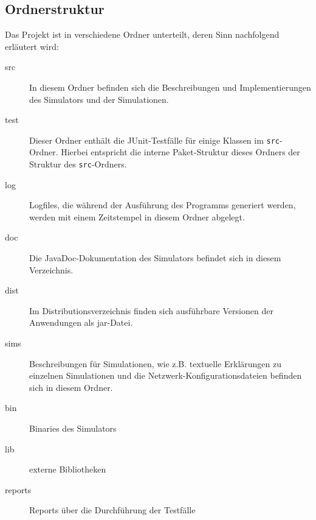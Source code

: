 \subsection{Ordnerstruktur}
Das Projekt ist in verschiedene Ordner unterteilt, deren Sinn nachfolgend erläutert wird:
\begin{description}
	\item[src] In diesem Ordner befinden sich die Beschreibungen und Implementierungen des Simulators und der Simulationen.
	\item[test] Dieser Ordner enthält die JUnit-Testfälle für einige Klassen im \texttt{src}-Ordner. Hierbei entspricht die interne Paket-Struktur dieses Ordners der Struktur des \texttt{src}-Ordners.
	\item[log] Logfiles, die während der Ausführung des Programms generiert werden, werden mit einem Zeitstempel in diesem Ordner abgelegt.
	\item[doc] Die JavaDoc-Dokumentation des Simulators befindet sich in diesem Verzeichnis.
	\item[dist] Im Distributionsverzeichnis finden sich ausführbare Versionen der Anwendungen als jar-Datei.
	\item[sims] Beschreibungen für Simulationen, wie z.B. textuelle Erklärungen zu einzelnen Simulationen und die Netzwerk-Konfigurationsdateien befinden sich in diesem Ordner.
	\item[bin] Binaries des Simulators
	\item[lib] externe Bibliotheken
	\item[reports] Reports über die Durchführung der Testfälle
\end{description}
